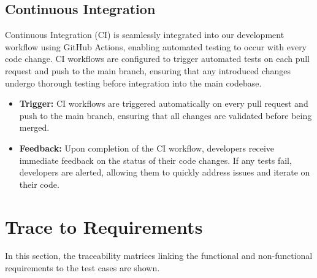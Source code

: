 \documentclass[12pt, titlepage]{article}
\begin{document}

\subsection{Continuous Integration}
Continuous Integration (CI) is seamlessly integrated into our development workflow using GitHub Actions, enabling automated testing to occur with every code change. CI workflows are configured to trigger automated tests on each pull request and push to the main branch, ensuring that any introduced changes undergo thorough testing before integration into the main codebase.
\begin{itemize}
    \item \textbf{Trigger:} CI workflows are triggered automatically on every pull request and push to the main branch, ensuring that all changes are validated before being merged.
    \item \textbf{Feedback:} Upon completion of the CI workflow, developers receive immediate feedback on the status of their code changes. If any tests fail, developers are alerted, allowing them to quickly address issues and iterate on their code.
\end{itemize}
    
\section{Trace to Requirements}
In this section, the traceability matrices linking the functional and non-functional requirements to the test cases are shown. \\
\end{document}
